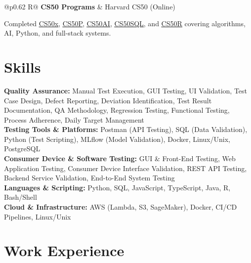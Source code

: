 \documentclass[a4paper,10pt]{article}
\newcommand{\ulink}[2]{\href{#1}{\uline{#2}}}
\newcommand{\subheading}[1]{{\color[HTML]{0A0A0A}\fontsize{12}{14}\selectfont\bfseries #1}}
\newcommand{\meta}[1]{{\color[HTML]{5C5C5C}\fontsize{10.5}{12.5}\selectfont #1}}
\begin{document}
\begin{tabularx}{\linewidth}{@{}p{0.62\linewidth} R@{}}
\subheading{CS50 Programs} & \meta{Harvard CS50 (Online)}
\end{tabularx}
\vspace{1pt}
{\color[HTML]{3A3A3A}\fontsize{11}{14}\selectfont Completed \ulink{https://cs50.harvard.edu/certificates/b14b78df-e05c-413e-a607-1dd27303053a}{CS50x}, \ulink{https://cs50.harvard.edu/certificates/32477052-9db4-49c4-a5a4-d7e58429ca2c}{CS50P}, \ulink{https://cs50.harvard.edu/certificates/9cdb4d4a-1250-4f8e-9fd7-191864e0f919}{CS50AI}, \ulink{https://cs50.harvard.edu/certificates/bc486f24-f085-4e61-8536-80940b97a1b9}{CS50SQL}, and \ulink{https://cs50.harvard.edu/certificates/666838e6-a053-4d82-b179-a60fe745fd84}{CS50R} covering algorithms, AI, Python, and full-stack systems.}

\vspace{2pt}

\section{Skills}
\vspace{5pt}
{\color[HTML]{0A0A0A}\fontsize{11}{14}\selectfont
\textbf{Quality Assurance:} Manual Test Execution, GUI Testing, UI Validation, Test Case Design, Defect Reporting, Deviation Identification, Test Result Documentation, QA Methodology, Regression Testing, Functional Testing, Process Adherence, Daily Target Management \\[2pt]
\textbf{Testing Tools \& Platforms:} Postman (API Testing), SQL (Data Validation), Python (Test Scripting), MLflow (Model Validation), Docker, Linux/Unix, PostgreSQL \\[2pt]
\textbf{Consumer Device \& Software Testing:} GUI \& Front-End Testing, Web Application Testing, Consumer Device Interface Validation, REST API Testing, Backend Service Validation, End-to-End System Testing \\[2pt]
\textbf{Languages \& Scripting:} Python, SQL, JavaScript, TypeScript, Java, R, Bash/Shell \\[2pt]
\textbf{Cloud \& Infrastructure:} AWS (Lambda, S3, SageMaker), Docker, CI/CD Pipelines, Linux/Unix}

\vspace{2pt}

\section{Work Experience}
\vspace{2pt}
\end{document}
